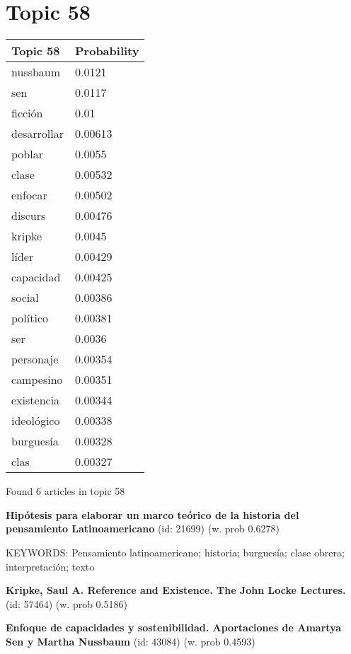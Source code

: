 \documentclass{article}
\begin{document}
\vfill
\newpage


\centering
\thispagestyle{empty}
\section*{Topic 58}\vfill
\begin{tabular}{ll}
\toprule
    Topic 58 & Probability \\
\midrule
    nussbaum &      0.0121 \\
         sen &      0.0117 \\
     ficción &        0.01 \\
 desarrollar &     0.00613 \\
      poblar &      0.0055 \\
       clase &     0.00532 \\
     enfocar &     0.00502 \\
     discurs &     0.00476 \\
      kripke &      0.0045 \\
       líder &     0.00429 \\
   capacidad &     0.00425 \\
      social &     0.00386 \\
    político &     0.00381 \\
         ser &      0.0036 \\
   personaje &     0.00354 \\
   campesino &     0.00351 \\
  existencia &     0.00344 \\
  ideológico &     0.00338 \\
   burguesía &     0.00328 \\
        clas &     0.00327 \\
\bottomrule
\end{tabular}

\vfill
Found 6 articles in topic 58
\vfill

\textbf{Hipótesis para elaborar un marco teórico de la historia del pensamiento Latinoamericano} (id: 21699)
 (w. prob 0.6278)


KEYWORDS:
Pensamiento latinoamericano; historia; burguesía; clase obrera; interpretación; texto
\vfill

\textbf{Kripke, Saul A. Reference and Existence. The John Locke Lectures.} (id: 57464)
 (w. prob 0.5186)
\vfill

\textbf{Enfoque de capacidades  y sostenibilidad. Aportaciones de Amartya Sen  y Martha Nussbaum} (id: 43084)
 (w. prob 0.4593)
\end{document}
